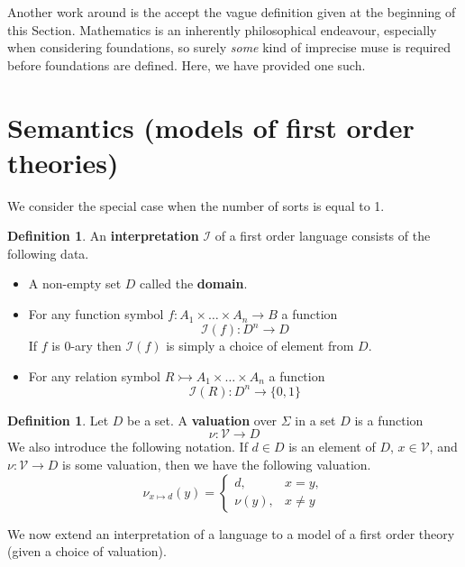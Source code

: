 \documentclass[12pt]{article}
\theoremstyle{plain}
\theoremstyle{definition}
\newtheorem{defn}[thm]{Definition} %
\newcommand{\call}[1]{\mathcal{#1}}
\newcommand{\lto}{\longrightarrow}
\begin{document}
	Another work around is the accept the vague definition given at the beginning of this Section. Mathematics is an inherently philosophical endeavour, especially when considering foundations, so surely \emph{some} kind of imprecise muse is required before foundations are defined. Here, we have provided one such.
	
	\section{Semantics (models of first order theories)}\label{sec:models}
	We consider the special case when the number of sorts is equal to 1.
	\begin{defn}
		An \textbf{interpretation} $\call{I}$ of a first order language consists of the following data.
		\begin{itemize}
			\item A non-empty set $D$ called the \textbf{domain}.
			\item For any function symbol $f: A_1 \times \hdots \times A_n \lto B$ a function
			\begin{equation}
				\call{I}(f): D^n \lto D
			\end{equation}
			If $f$ is $0$-ary then $\call{I}(f)$ is simply a choice of element from $D$.
			\item For any relation symbol $R \rightarrowtail A_1 \times \hdots \times A_n$ a function
			\begin{equation}
				\call{I}(R): D^n \lto \lbrace 0,1\rbrace
			\end{equation}
		\end{itemize}
	\end{defn}
	
	\begin{defn}
		Let $D$ be a set. A \textbf{valuation} over $\Sigma$ in a set $D$ is a function
		\begin{equation}
			\nu: \call{V} \lto D
		\end{equation}
		We also introduce the following notation. If $d \in D$ is an element of $D$, $x \in \call{V}$, and $\nu: \call{V} \lto D$ is some valuation, then we have the following valuation.
		\begin{equation}
			\nu_{x \mapsto d}(y) =
			\begin{cases}
				d, & x = y,\\
				\nu(y), & x \neq y
			\end{cases}
		\end{equation}
	\end{defn}
	We now extend an interpretation of a language to a model of a first order theory (given a choice of valuation).
	
\end{document}
